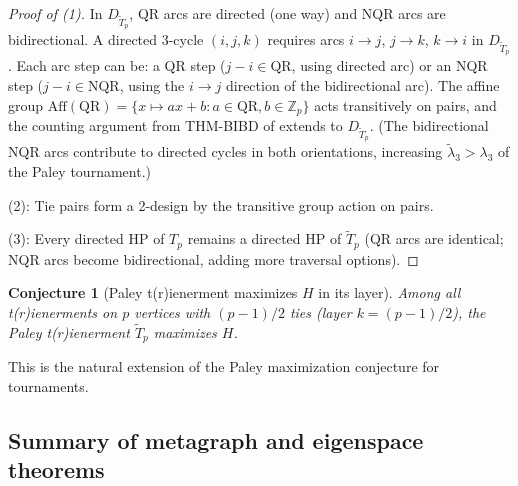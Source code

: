 \documentclass[12pt,reqno]{amsart}
\theoremstyle{definition}
\theoremstyle{plain}
\newtheorem{conjecture}[theorem]{Conjecture}
\begin{document}
\begin{proof}[Proof of (1)]
In $D_{\tilde{T}_p}$, QR arcs are directed (one way) and NQR arcs are bidirectional.
A directed 3-cycle $(i,j,k)$ requires arcs $i\to j$, $j\to k$, $k\to i$ in $D_{\tilde{T}_p}$.
Each arc step can be: a QR step ($j-i\in\mathrm{QR}$, using directed arc) or an NQR step
($j-i\in\mathrm{NQR}$, using the $i\to j$ direction of the bidirectional arc).
The affine group $\mathrm{Aff}(\mathrm{QR})=\{x\mapsto ax+b:a\in\mathrm{QR},b\in\mathbb{Z}_p\}$
acts transitively on pairs, and the counting argument from THM-BIBD of \cite{Cassidy2026}
extends to $D_{\tilde{T}_p}$.  (The bidirectional NQR arcs contribute to directed cycles in
both orientations, increasing $\tilde{\lambda}_3>\lambda_3$ of the Paley tournament.)

(2): Tie pairs form a 2-design by the transitive group action on pairs.

(3): Every directed HP of $T_p$ remains a directed HP of $\tilde{T}_p$
(QR arcs are identical; NQR arcs become bidirectional, adding more traversal options).
\end{proof}

\begin{conjecture}[Paley t(r)ienerment maximizes $H$ in its layer]
Among all t(r)ienerments on $p$ vertices with $(p-1)/2$ ties (layer $k=(p-1)/2$),
the Paley t(r)ienerment $\tilde{T}_p$ maximizes $H$.
\end{conjecture}

This is the natural extension of the Paley maximization conjecture for tournaments.

\subsection{Summary of metagraph and eigenspace theorems}
\label{ssec:summary-eigenspace}
\end{document}
